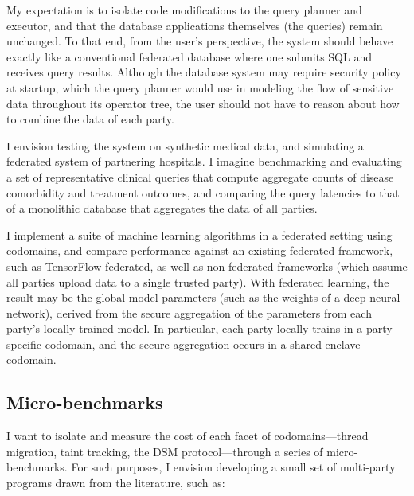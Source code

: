 My expectation is to isolate code modifications to the query planner and
executor, and that the database
applications themselves (the queries) remain unchanged. 
%
To that end, from the user's perspective, the system should behave
exactly like a conventional federated database where one submits SQL and
receives query results. 
%
Although the database system may require security policy at startup, which the
query planner would use in modeling the flow of sensitive data throughout its
operator tree, the user should not have to reason about how to combine the data
of each party.


I envision testing the system on synthetic medical data, and simulating a
federated system of partnering hospitals.
%
I imagine benchmarking and evaluating a set of representative clinical queries
that compute aggregate counts of disease comorbidity and treatment outcomes,
and comparing the query latencies to that of a monolithic database that
aggregates the data of all parties.







%
I implement a suite of machine learning algorithms in a federated setting using
codomains, and compare performance against an existing federated framework,
such as TensorFlow-federated, as well as non-federated frameworks (which
assume all parties upload data to a single trusted party).
%
With federated learning, the result may be the global model parameters (such
as the weights of a deep neural network), derived from the secure aggregation of the
parameters from each party's locally-trained model.
%
In particular, each party locally trains in a party-specific codomain, and the
secure aggregation occurs in a shared enclave-codomain.


\subsection{Micro-benchmarks}

I want to isolate and measure the cost
of each facet of codomains---thread migration, taint tracking, the DSM
protocol---through a series of micro-benchmarks.
%
For such purposes, I envision developing a small set of multi-party programs
drawn from the literature, such as:

